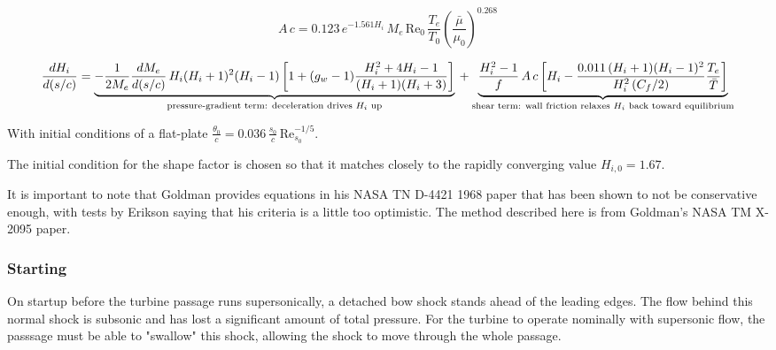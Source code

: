 \begin{equation}
    A\,c = 0.123\,e^{-1.561 H_i}\, M_e\, \mathrm{Re}_0\, \frac{T_e}{T_0}\left(\frac{\bar\mu}{\mu_0}\right)^{0.268}
\end{equation}

\begin{equation}
\frac{dH_i}{d(s/c)} = \underbrace{-\frac{1}{2M_e}\frac{dM_e}{d(s/c)}\,H_i(H_i+1)^2(H_i-1)\left[1 + (g_w-1)\frac{H_i^2+4H_i-1}{(H_i+1)(H_i+3)}\right]}_{\text{pressure-gradient term: deceleration drives } H_i \text{ up}} \\ + \underbrace{\frac{H_i^2-1}{f}\,A\,c\left[H_i - \frac{0.011\,(H_i+1)(H_i-1)^2}{H_i^2\,(C_f/2)}\frac{T_e}{\bar T}\right]}_{\text{shear term: wall friction relaxes } H_i \text{ back toward equilibrium}}
\end{equation}

With initial conditions of a flat-plate $\frac{\theta_0}{c} = 0.036\,\frac{s_0}{c}\,\mathrm{Re}_{s_0}^{-1/5}$. 

The initial condition for the shape factor is chosen so that it matches closely to the rapidly converging value $ H_{i,0} = 1.67$. 

It is important to note that Goldman provides equations in his NASA TN D-4421 1968 paper that has been shown to not be conservative enough, with tests by Erikson saying that his criteria is a little too optimistic. The method described here is from Goldman's NASA TM X-2095 paper.




\subsubsection{Starting}

On startup before the turbine passage runs supersonically, a detached bow shock stands ahead of the leading edges. The flow behind this normal shock is subsonic and has lost a significant amount of total pressure. For the turbine to operate nominally with supersonic flow, the passsage must be able to "swallow" this shock, allowing the shock to move through the whole passage.

